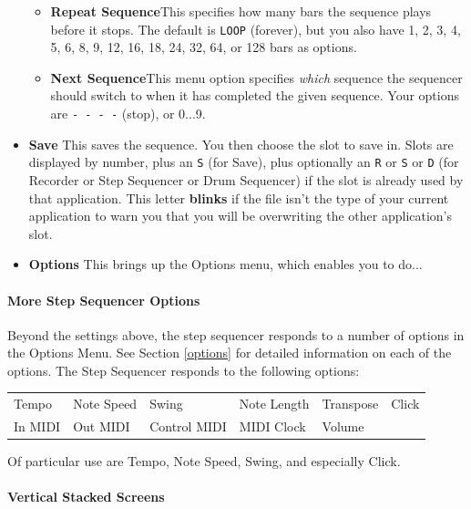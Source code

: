 \documentclass{article}
\begin{document}
\begin{itemize}
\begin{itemize}
\item {\bf Repeat Sequence}\quad This specifies how many bars the sequence plays before it stops.  The default is {\tt LOOP} (forever), but you also have 1, 2, 3, 4, 5, 6, 8, 9, 12, 16, 18, 24, 32, 64, or 128 bars as options.
\item {\bf Next Sequence}\quad This menu option specifies {\it which} sequence the sequencer should switch to when it has completed the given sequence.  Your options are {\tt - - - -} (stop), or 0...9.
\end{itemize} 

\item {\bf Save} \quad This saves the sequence. You then choose the slot to save in.  Slots are displayed by number, plus an \texttt{S} (for Save), plus optionally an \texttt{R} or \texttt{S} or \texttt{D} (for Recorder or Step Sequencer or Drum Sequencer) if the slot is already used by that application.  This letter {\bf blinks} if the file isn't the type of your current application to warn you that you will be overwriting the other application's slot.

\item {\bf Options} \quad This brings up the Options menu, which enables you to do...
\end{itemize}

\paragraph{More Step Sequencer Options}

Beyond the settings above, the step sequencer responds to a number of options in the Options Menu.  See Section \ref{options} for detailed information on each of the options.  The Step Sequencer responds to the following options:


\vspace{1em}
\begin{tabular}{llllll}
Tempo& Note Speed& Swing & Note Length&Transpose&Click\\
In MIDI& Out MIDI&Control MIDI&MIDI Clock&Volume\\
\end{tabular}

\vspace{1em}
Of particular use are Tempo, Note Speed, Swing, and especially Click.


\paragraph{Vertical Stacked Screens}
\end{document}
